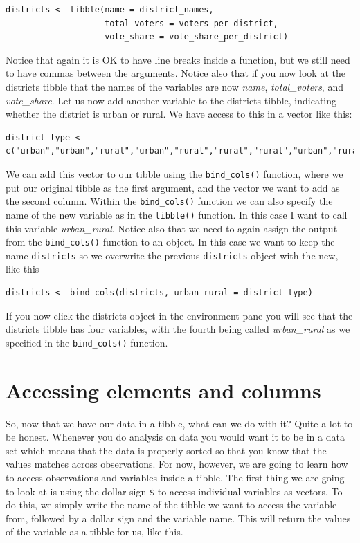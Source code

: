 \documentclass[
]{book}
\begin{document}
\begin{verbatim}
districts <- tibble(name = district_names,
                    total_voters = voters_per_district,
                    vote_share = vote_share_per_district)
\end{verbatim}

Notice that again it is OK to have line breaks inside a function, but we still need to have commas between the arguments. Notice also that if you now look at the districts tibble that the names of the variables are now \emph{name}, \emph{total\_voters}, and \emph{vote\_share}. Let us now add another variable to the districts tibble, indicating whether the district is urban or rural. We have access to this in a vector like this:

\begin{verbatim}
district_type <- c("urban","urban","rural","urban","rural","rural","rural","urban","rural","rural")
\end{verbatim}

We can add this vector to our tibble using the \texttt{bind\_cols()} function, where we put our original tibble as the first argument, and the vector we want to add as the second column. Within the \texttt{bind\_cols()} function we can also specify the name of the new variable as in the \texttt{tibble()} function. In this case I want to call this variable \emph{urban\_rural}. Notice also that we need to again assign the output from the \texttt{bind\_cols()} function to an object. In this case we want to keep the name \texttt{districts} so we overwrite the previous \texttt{districts} object with the new, like this

\begin{verbatim}
districts <- bind_cols(districts, urban_rural = district_type)
\end{verbatim}

If you now click the districts object in the environment pane you will see that the districts tibble has four variables, with the fourth being called \emph{urban\_rural} as we specified in the \texttt{bind\_cols()} function.

\hypertarget{accessing-elements-and-columns}{%
\section{Accessing elements and columns}\label{accessing-elements-and-columns}}

So, now that we have our data in a tibble, what can we do with it? Quite a lot to be honest. Whenever you do analysis on data you would want it to be in a data set which means that the data is properly sorted so that you know that the values matches across observations. For now, however, we are going to learn how to access observations and variables inside a tibble. The first thing we are going to look at is using the dollar sign \texttt{\$} to access individual variables as vectors. To do this, we simply write the name of the tibble we want to access the variable from, followed by a dollar sign and the variable name. This will return the values of the variable as a tibble for us, like this.
\end{document}
